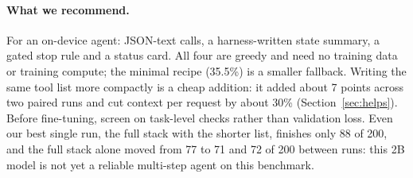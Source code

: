 \documentclass[11pt]{article}
\begin{document}
\paragraph{What we recommend.} For an on-device agent: JSON-text calls, a harness-written state summary, a gated stop rule and a status card. All four are greedy and need no training data or training compute; the minimal recipe (35.5\%) is a smaller fallback. Writing the same tool list more compactly is a cheap addition: it added about 7 points across two paired runs and cut context per request by about 30\% (Section~\ref{sec:helps}). Before fine-tuning, screen on task-level checks rather than validation loss. Even our best single run, the full stack with the shorter list, finishes only 88 of 200, and the full stack alone moved from 77 to 71 and 72 of 200 between runs: this 2B model is not yet a reliable multi-step agent on this benchmark.
\end{document}
